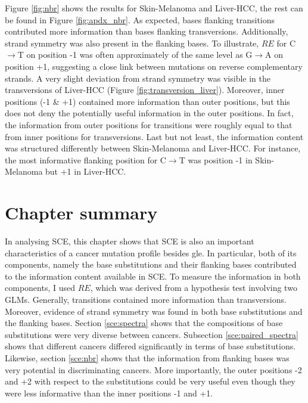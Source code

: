 

Figure \ref{fig:nbr} shows the results for Skin-Melanoma and Liver-HCC, the rest can be found in Figure \ref{fig:apdx_nbr}. As expected, bases flanking transitions contributed more information than bases flanking transversions. Additionally, strand symmetry was also present in the flanking bases. To illustrate, $RE$ for C$\rightarrow$T on position -1 was often approximately of the same level as G$\rightarrow$A on position +1, suggesting a close link between mutations on reverse complementary strands. A very slight deviation from strand symmetry was visible in the transversions of Liver-HCC (Figure \ref{fig:transversion_liver}). Moreover, inner positions (-1 \& +1) contained more information than outer positions, but this does not deny the potentially useful information in the outer positions. In fact, the information from outer positions for transitions were roughly equal to that from inner positions for transversions. Last but not least, the information content was structured differently between Skin-Melanoma and Liver-HCC. For instance, the most informative flanking position for C$\rightarrow$T was position -1 in Skin-Melanoma but +1 in Liver-HCC.


\section{Chapter summary}
In analysing SCE, this chapter shows that SCE is also an important characteristics of a cancer mutation profile besides \gls{gle}. In particular, both of its components, namely the base substitutions and their flanking bases contributed to the information content available in SCE. To measure the information in both components, I used $RE$, which was derived from a hypothesis test involving two GLMs. Generally, transitions contained more information than transversions. Moreover, evidence of strand symmetry was found in both base substitutions and the flanking bases. Section \ref{sce:spectra} shows that the compositions of base substitutions were very diverse between cancers. Subsection \ref{sce:paired_spectra} shows that different cancers differed significantly in terms of base substitutions. Likewise, section \ref{sce:nbr} shows that the information from flanking bases was very potential in discriminating cancers. More importantly, the outer positions -2 and +2 with respect to the substitutions could be very useful even though they were less informative than the inner positions -1 and +1.
